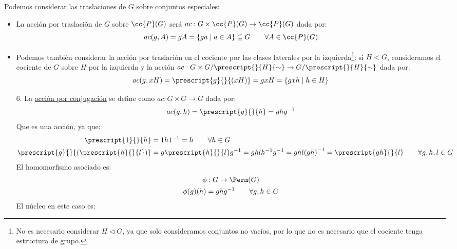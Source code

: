 \begin{ejemplo}
    Podemos considerar las traslaciones de $G$ sobre conjuntos especiales:
    \begin{itemize}
        \item La acción por traslación de $G$ sobre $\cc{P}(G)$ será $ac:G\times \cc{P}(G) \to \cc{P}(G)$ dada por:
            \begin{equation*}
                ac(g,A) = gA = \{ga \mid a\in A\}  \subseteq G \qquad \forall A\in \cc{P}(G)
            \end{equation*}
        \item Podemos también considerar la acción por traslación en el cociente por las clases laterales por la izquierda\footnote{No es necesario considerar $H\lhd G$, ya que solo consideramos conjuntos no vacíos, por lo que no es necesario que el cociente tenga estructura de grupo.}: si $H<G$, consideramos el cociente de $G$ sobre $H$ por la izquierda y la acción $ac:G\times G/\prescript{}{H}{\sim} \to G/\prescript{}{H}{\sim}$ dada por:
            \begin{equation*}
                ac(g,xH) = \prescript{g}{}{(xH)} = gxH  = \{gxh \mid h\in H\}
            \end{equation*}
    \end{itemize}
    \begin{enumerate}
        \item[6.] La \underline{acción por conjugación} se define como $ac:G\times G\to G$ dada por:
            \begin{equation*}
                ac(g,h) = \prescript{g}{}{h} = ghg^{-1}
            \end{equation*}
            Que es una acción, ya que:
            \begin{align*}
                \prescript{1}{}{h} &= 1h1^{-1} = h \qquad \forall h\in G\\
                \prescript{g}{}{(\prescript{h}{}{l})} &= g\prescript{h}{}{l}g^{-1} = ghlh^{-1}g^{-1} = ghl{(gh)}^{-1} = \prescript{gh}{}{l} \qquad \forall g,h,l \in G
            \end{align*}
            El homomorfismo asociado es:
            \begin{gather*}
                \phi:G\to\Perm(G) \\
                \phi(g)(h) = ghg^{-1} \qquad \forall g,h\in G
            \end{gather*}
            El núcleo en este caso es:
            \begin{equation*}

\end{equation*}
\end{enumerate}
\end{ejemplo}
